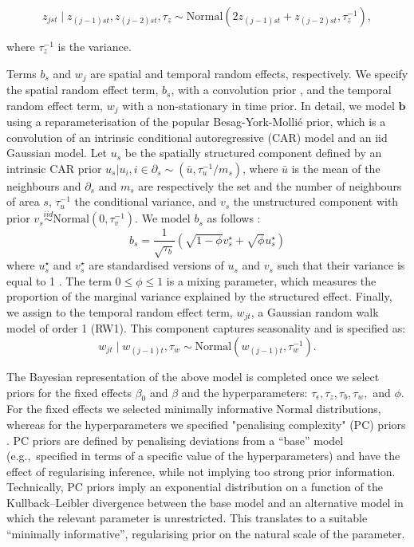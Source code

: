 \begin{equation*}
z_{jst} \mid z_{(j-1)st}, z_{(j-2)st}, \tau_z \sim \text{Normal}\left(2z_{(j-1)st}+z_{(j-2)st},\tau_z^{-1}\right),
\end{equation*}

\noindent where $\tau_z^{-1}$ is the variance.

Terms $b_s$ and $w_j$ are spatial and temporal random effects, respectively. We specify the spatial random effect term, $b_s$, with a convolution prior \citep{besag1991bayesian}, and the temporal random effect term, $w_j$ with a non-stationary in time prior. In detail, we model $\boldsymbol{b}$ using a reparameterisation of the popular Besag-York-Molli\'e prior, which is a convolution of an intrinsic conditional autoregressive (CAR) model and an iid Gaussian model. Let $u_s$ be the spatially structured component defined by an intrinsic CAR \citep{Besag1974} prior  $u_s|u_i,i\in \partial_s \sim(\bar{u},\tau_u^{-1}/m_s)$, where $\bar{u}$ is the mean of the neighbours and $\partial_s$ and $m_s$ are respectively the set and the number of neighbours of area $s$,  $\tau_u^{-1}$ the conditional variance, and $v_s$  the unstructured component with prior $v_s \overset{iid}{\sim} \text{Normal}(0,\tau_v^{-1})$. We model $b_s$ as follows \citep{besag1991bayesian, riebler2016intuitive,  konstantinoudis_discrete}:
\[
b_s=\frac{1}{\sqrt{\tau_b}}\left(\sqrt{1-\phi}v^\star_s+\sqrt{\phi}u^\star_s\right)
\]
where $u_s^\star$ and $v_s^\star$ are standardised versions of $u_s$ and $v_s$ such that their variance is equal to 1 \citep{simpson2017penalising}.
The term $0\leq \phi\leq 1$ is a mixing parameter, which measures the proportion of the marginal variance explained by the structured effect.
Finally, we assign to the temporal random effect term, $w_{jt}$, a Gaussian random walk model of order 1 (RW1). This component captures seasonality and is specified as:
\[
w_{jt} \mid w_{(j-1)t}, \tau_w \sim \text{Normal}(w_{(j-1)t},\tau_w^{-1}).
\]

The Bayesian representation of the above model is completed once we select priors for the fixed effects $\beta_0$ and {\boldmath$\beta$} and the hyperparameters: $\tau_{\epsilon}, \tau_z, \tau_b, \tau_w,$ and $\phi$. For the fixed effects we selected minimally informative Normal distributions, whereas for the hyperparameters we specified "penalising complexity" (PC)  priors \citep{simpson2017penalising}. PC priors are defined by penalising deviations from a ``base'' model (e.g.,~specified in terms of a specific value of the hyperparameters) and have the effect of regularising inference, while not implying too strong prior information. Technically, PC priors imply an exponential distribution on a function of the Kullback–Leibler divergence between the base model and an alternative model in which the relevant parameter is unrestricted. This translates to a suitable ``minimally informative'', regularising prior on the natural scale of the parameter.

